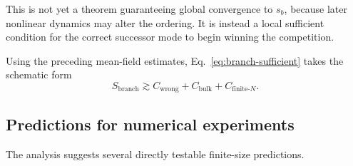 This is not yet a theorem guaranteeing global convergence to $s_b$, because
later nonlinear dynamics may alter the ordering.  It is instead a local
sufficient condition for the correct successor mode to begin winning the
competition.

Using the preceding mean-field estimates, Eq.~\eqref{eq:branch-sufficient}
takes the schematic form
\begin{equation}
S_{\mathrm{branch}}
\gtrsim
C_{\mathrm{wrong}}
+
C_{\mathrm{bulk}}
+
C_{\mathrm{finite}\text{-}N}.
\end{equation}

\subsection{Predictions for numerical experiments}

The analysis suggests several directly testable finite-size predictions.

